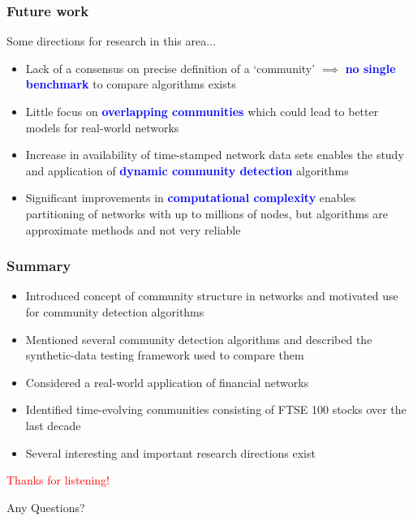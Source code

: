 \documentclass{beamer}
\begin{document}

\begin{frame}
	\frametitle{Future work}
	Some directions for research in this area...
	\begin{itemize}
		\vfill\item Lack of a consensus on precise definition of a `community' $\implies$ \textcolor{blue}{\textbf{no single benchmark}} to compare algorithms exists
		\vfill\item Little focus on \textcolor{blue}{\textbf{overlapping communities}} which could lead to better models for real-world networks
		\vfill\item Increase in availability of time-stamped network data sets enables the study and application of \textcolor{blue}{\textbf{dynamic community detection}} algorithms
		\vfill\item Significant improvements in \textcolor{blue}{\textbf{computational complexity}} enables partitioning of networks with up to millions of nodes, but algorithms are approximate methods and not very reliable
	\end{itemize}
\end{frame}


\begin{frame}
	\frametitle{Summary}
	\begin{itemize}
		\vfill\item Introduced concept of community structure in networks and motivated use for community detection algorithms
		\vfill\item Mentioned several community detection algorithms and described the synthetic-data testing framework used to compare them
		\vfill\item Considered a real-world application of financial networks
		\vfill\item Identified time-evolving communities consisting of FTSE 100 stocks over the last decade
		\vfill\item Several interesting and important research directions exist
	\end{itemize}
\end{frame}


\begin{frame}
	\Huge{\centerline{\textcolor{red}{Thanks for listening!}}}
	\Huge{\centerline{Any Questions?}}
\end{frame}

\end{document}
